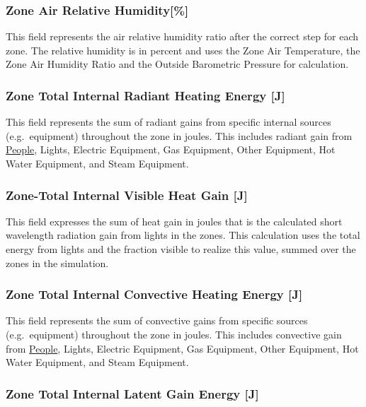 \subsubsection{Zone Air Relative Humidity{[}\%{]}}\label{zone-air-relative-humidity-1}

This field represents the air relative humidity ratio after the correct step for each zone. The relative humidity is in percent and uses the Zone Air Temperature, the Zone Air Humidity Ratio and the Outside Barometric Pressure for calculation.

\subsubsection{Zone Total Internal Radiant Heating Energy {[}J{]}}\label{zone-total-internal-radiant-heating-energy-j-1}

This field represents the sum of radiant gains from specific internal sources (e.g.~equipment) throughout the zone in joules. This includes radiant gain from \hyperref[people]{People}, Lights, Electric Equipment, Gas Equipment, Other Equipment, Hot Water Equipment, and Steam Equipment.

\subsubsection{Zone-Total Internal Visible Heat Gain {[}J{]}}\label{zone-total-internal-visible-heat-gain-j}

This field expresses the sum of heat gain in joules that is the calculated short wavelength radiation gain from lights in the zones. This calculation uses the total energy from lights and the fraction visible to realize this value, summed over the zones in the simulation.

\subsubsection{Zone Total Internal Convective Heating Energy {[}J{]}}\label{zone-total-internal-convective-heating-energy-j-1}

This field represents the sum of convective gains from specific sources (e.g.~equipment) throughout the zone in joules. This includes convective gain from \hyperref[people]{People}, Lights, Electric Equipment, Gas Equipment, Other Equipment, Hot Water Equipment, and Steam Equipment.

\subsubsection{Zone Total Internal Latent Gain Energy {[}J{]}}\label{zone-total-internal-latent-gain-energy-j-1}

